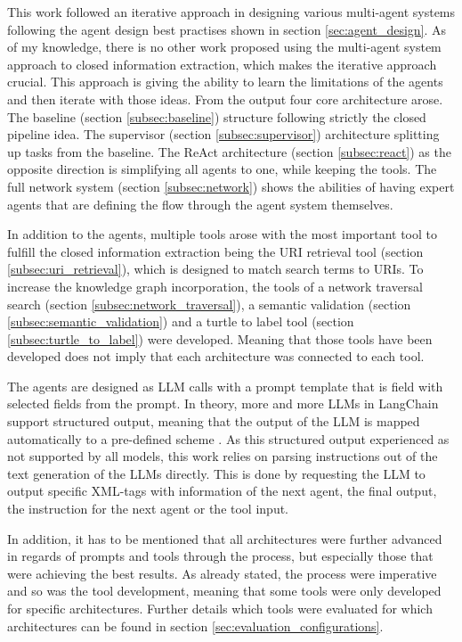 \documentclass[a4paper,oneside,bibliography=totoc]{scrbook}
\begin{document}
This work followed an iterative approach in designing various multi-agent systems following the agent design best practises shown in section \ref{sec:agent_design}. As of my knowledge, there is no other work proposed using the multi-agent system approach to closed information extraction, which makes the iterative approach crucial. This approach is giving the ability to learn the limitations of the agents and then iterate with those ideas. From the output four core architecture arose. The baseline (section \ref{subsec:baseline}) structure following strictly the closed pipeline idea. The supervisor (section \ref{subsec:supervisor}) architecture splitting up tasks from the baseline. The ReAct architecture (section \ref{subsec:react}) as the opposite direction is simplifying all agents to one, while keeping the tools. The full network system (section \ref{subsec:network}) shows the abilities of having expert agents that are defining the flow through the agent system themselves.

In addition to the agents, multiple tools arose with the most important tool to fulfill the closed information extraction being the URI retrieval tool (section \ref{subsec:uri_retrieval}), which is designed to match search terms to URIs. To increase the knowledge graph incorporation, the tools of a network traversal search (section \ref{subsec:network_traversal}), a semantic validation (section \ref{subsec:semantic_validation}) and a turtle to label tool (section \ref{subsec:turtle_to_label}) were developed. Meaning that those tools have been developed does not imply that each architecture was connected to each tool.

The agents are designed as \ac{LLM} calls with a prompt template that is field with selected fields from the prompt. In theory, more and more \acp{LLM} in LangChain support structured output, meaning that the output of the \ac{LLM} is mapped automatically to a pre-defined scheme \cite{LangChain2025e}. As this structured output experienced as not supported by all models, this work relies on parsing instructions out of the text generation of the \acp{LLM} directly. This is done by requesting the \ac{LLM} to output specific XML-tags with information of the next agent, the final output, the instruction for the next agent or the tool input.

In addition, it has to be mentioned that all architectures were further advanced in regards of prompts and tools through the process, but especially those that were achieving the best results. As already stated, the process were imperative and so was the tool development, meaning that some tools were only developed for specific architectures. Further details which tools were evaluated for which architectures can be found in section \ref{sec:evaluation_configurations}.
\end{document}
